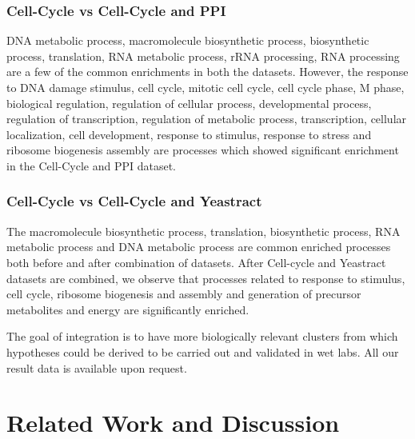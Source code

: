 \subsubsection{Cell-Cycle vs Cell-Cycle and PPI}
DNA metabolic process, macromolecule biosynthetic process, biosynthetic process, translation, RNA metabolic process, rRNA processing, 
RNA processing are a few of the common enrichments in both the datasets. However, the response to DNA damage stimulus, cell cycle, mitotic cell cycle, 
cell cycle phase, M phase, biological regulation, regulation of cellular process, developmental process, regulation of transcription, 
regulation of metabolic process, transcription, cellular localization, cell development, response to stimulus, response to 
stress and ribosome biogenesis assembly are processes which showed significant enrichment in the Cell-Cycle and PPI dataset.

\subsubsection{Cell-Cycle vs Cell-Cycle and Yeastract}
The macromolecule biosynthetic process, translation, biosynthetic process, RNA metabolic process and DNA metabolic process are common enriched processes 
both before and after combination of datasets. After Cell-cycle and Yeastract datasets are combined, we observe that processes related to response to stimulus, 
cell cycle, ribosome biogenesis and assembly and generation of precursor metabolites and energy are significantly enriched.

The goal of integration is to have more biologically relevant clusters from which hypotheses could be derived to be carried out and validated in wet labs. 
All our result data is available upon request. 

\section{Related Work and Discussion}

